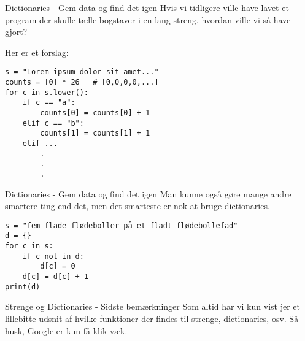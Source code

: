 \documentclass[main.tex]{subfiles}
\begin{document}
\begin{frame}[fragile]{Dictionaries - Gem data og find det igen}
	Hvis vi tidligere ville have lavet et program der skulle tælle bogstaver i en lang streng, hvordan ville vi så have gjort?
	\pause
	
	Her er et forslag:
	\begin{lstlisting}[style=python]
s = "Lorem ipsum dolor sit amet..."
counts = [0] * 26	# [0,0,0,0,...]
for c in s.lower():
    if c == "a":
        counts[0] = counts[0] + 1
    elif c == "b":
        counts[1] = counts[1] + 1
    elif ...
        .
        .
        .
	\end{lstlisting}
\end{frame}


\begin{frame}[fragile]{Dictionaries - Gem data og find det igen}
	Man kunne også gøre mange andre smartere ting end det, men det smarteste er nok at bruge dictionaries.
	\pause
	\begin{lstlisting}[style=python]
s = "fem flade flødeboller på et fladt flødebollefad"
d = {}
for c in s:
    if c not in d:
        d[c] = 0
    d[c] = d[c] + 1
print(d)
	\end{lstlisting}
\end{frame}

\begin{frame}[fragile]{Strenge og Dictionaries - Sidste bemærkninger}
	Som altid har vi kun vist jer et lillebitte udsnit af hvilke funktioner der findes til strenge, dictionaries, osv. Så husk, Google er kun få klik væk.
\end{frame}




\end{document}
